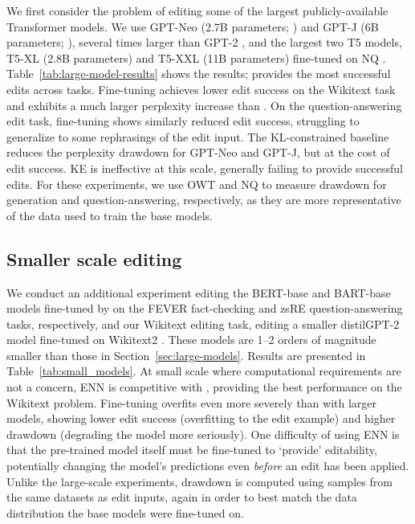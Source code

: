 \documentclass{article}
\begin{document}
We first consider the problem of editing some of the largest publicly-available Transformer models. We use GPT-Neo (2.7B parameters; \citealp{gpt-neo}) and GPT-J (6B parameters; \citealp{gpt-j}), several times larger than GPT-2 \citep{radford2019language}, and the largest two T5 models, T5-XL (2.8B parameters) and T5-XXL (11B parameters) fine-tuned on NQ \citep{roberts2020knowledge}. Table~\ref{tab:large-model-results} shows the results; {\name} provides the most successful edits across tasks. Fine-tuning achieves lower edit success on the Wikitext task and exhibits a much larger perplexity increase than \name\@. On the question-answering edit task, fine-tuning shows similarly reduced edit success, struggling to generalize to some rephrasings of the edit input. The KL-constrained baseline reduces the perplexity drawdown for GPT-Neo and GPT-J, but at the cost of edit success. KE is ineffective at this scale, generally failing to provide successful edits. For these experiments, we use OWT and NQ to measure drawdown for generation and question-answering, respectively, as they are more representative of the data used to train the base models.

\subsection{Smaller scale editing}
\label{sec:small-scale}

We conduct an additional experiment editing the BERT-base and BART-base models fine-tuned by \citet{Cao2021EditingFK} on the FEVER fact-checking and zsRE question-answering tasks, respectively, and our Wikitext editing task, editing a smaller distilGPT-2 model \citep{wolf2019hugging} fine-tuned on Wikitext2 \citep{distilgpt2}. These models are 1--2 orders of magnitude smaller than those in Section~\ref{sec:large-models}. Results are presented in Table~\ref{tab:small_models}. At small scale where computational requirements are not a concern, ENN is competitive with \name, providing the best performance on the Wikitext problem. Fine-tuning overfits even more severely than with larger models, showing lower edit success (overfitting to the edit example) and higher drawdown (degrading the model more seriously). One difficulty of using ENN is that the pre-trained model itself must be fine-tuned to `provide' editability, potentially changing the model's predictions even \textit{before} an edit has been applied. Unlike the large-scale experiments, drawdown is computed using samples from the same datasets as edit inputs, again in order to best match the data distribution the base models were fine-tuned on. 
\end{document}
